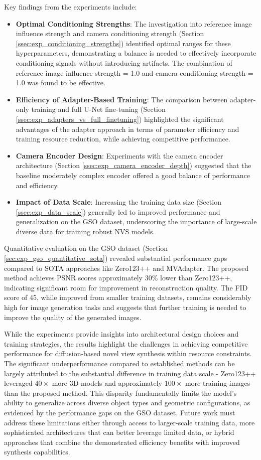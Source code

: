 Key findings from the experiments include:
\begin{itemize}
  \item \textbf{Optimal Conditioning Strengths}: The investigation into reference image influence strength and camera conditioning strength (Section \ref{ssec:exp_conditioning_strengths}) identified optimal ranges for these hyperparameters, demonstrating a balance is needed to effectively incorporate conditioning signals without introducing artifacts. The combination of reference image influence strength = 1.0 and camera conditioning strength = 1.0 was found to be effective.
  \item \textbf{Efficiency of Adapter-Based Training}: The comparison between adapter-only training and full U-Net fine-tuning (Section \ref{ssec:exp_adapters_vs_full_finetuning}) highlighted the significant advantages of the adapter approach in terms of parameter efficiency and training resource reduction, while achieving competitive performance.
  \item \textbf{Camera Encoder Design}: Experiments with the camera encoder architecture (Section \ref{ssec:exp_camera_encoder_depth}) suggested that the baseline moderately complex encoder offered a good balance of performance and efficiency.
  \item \textbf{Impact of Data Scale}: Increasing the training data size (Section \ref{ssec:exp_data_scale}) generally led to improved performance and generalization on the GSO dataset, underscoring the importance of large-scale diverse data for training robust NVS models.
\end{itemize}

Quantitative evaluation on the GSO dataset (Section \ref{sec:exp_gso_quantitative_sota}) revealed substantial performance gaps compared to SOTA approaches like Zero123++ and MVAdapter. The proposed method achieves PSNR scores approximately $30\%$ lower than Zero123++, indicating significant room for improvement in reconstruction quality. The FID score of 45, while improved from smaller training datasets, remains considerably high for image generation tasks and suggests that further training is needed to improve the quality of the generated images.

While the experiments provide insights into architectural design choices and training strategies, the results highlight the challenges in achieving competitive performance for diffusion-based novel view synthesis within resource constraints. The significant underperformance compared to established methods can be largely attributed to the substantial difference in training data scale - Zero123++ leveraged $40\times$ more 3D models and approximately $100\times$ more training images than the proposed method. This disparity fundamentally limits the model's ability to generalize across diverse object types and geometric configurations, as evidenced by the performance gaps on the GSO dataset. Future work must address these limitations either through access to larger-scale training data, more sophisticated architectures that can better leverage limited data, or hybrid approaches that combine the demonstrated efficiency benefits with improved synthesis capabilities.